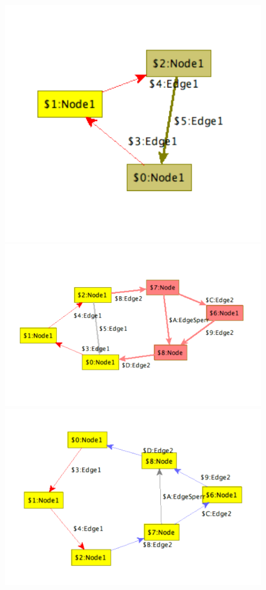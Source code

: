 \begin{figure}[htbp]
\begin{example}
\begin{center}
  \parbox{0.2\linewidth}{\includegraphics[width=\linewidth]{fig/debug1tra}}\parbox{0.375\linewidth}{\includegraphics[width=\linewidth]{fig/debug2tra}}\parbox{0.375\linewidth}{\includegraphics[width=\linewidth]{fig/debug3tra}}

\end{center}
\end{example}
\end{figure}
